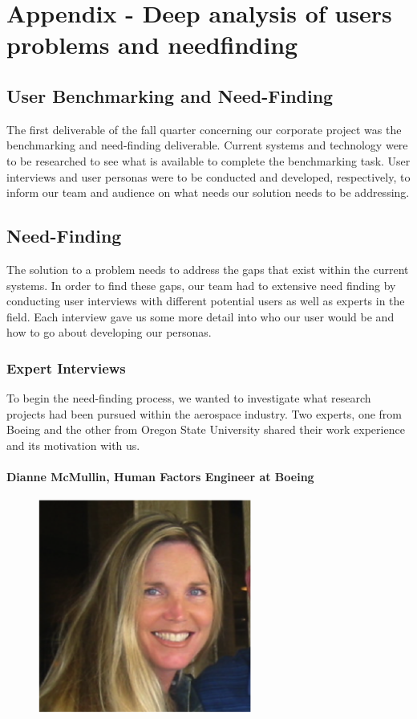 \chapter{Appendix - Deep analysis of users problems and needfinding}

\section{User Benchmarking and Need-Finding}
The first deliverable of the fall quarter concerning our corporate project was the benchmarking and need-finding deliverable.  Current systems and technology were to be researched to see what is available to complete the benchmarking task.  User interviews and user personas were to be conducted and developed, respectively, to inform our team and audience on what needs our solution needs to be addressing. 

\section{Need-Finding}
The solution to a problem needs to address the gaps that exist within the current systems. In order to find these gaps, our team had to extensive need finding by conducting user interviews with different potential users as well as experts in the field.  Each interview gave us some more detail into who our user would be and how to go about developing our personas.

\subsection{Expert Interviews}
To begin the need-finding process, we wanted to investigate what research projects had been pursued within the aerospace industry. Two experts, one from Boeing and the other from Oregon State University shared their work experience and its motivation with us. 

\subsubsection{Dianne McMullin, Human Factors Engineer at Boeing}
\begin{figure}[h]
  \centering
     \includegraphics[width=7cm]{images/image020}
  \label{fig:20}
\end{figure}

